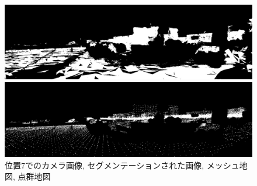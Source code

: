 \begin{figure}[htbp]
\begin{minipage}[b]{0.50\hsize}
\begin{center}
  \end{center}
 \end{minipage} \\
  \begin{minipage}[b]{0.50\hsize}
 \begin{center}
  \includegraphics[keepaspectratio, scale=0.18]{./picture/valued_mesh_map_image/image6.jpg}
  \end{center}
 \end{minipage}
 \begin{minipage}[b]{0.50\hsize}
 \begin{center}
  \includegraphics[keepaspectratio, scale=0.18]{./picture/valued_point_map_image/image6.jpg}
  \end{center}
 \end{minipage}
 \caption{位置7でのカメラ画像, セグメンテーションされた画像, メッシュ地図, 点群地図}\label{fig:place7}
\end{figure}

